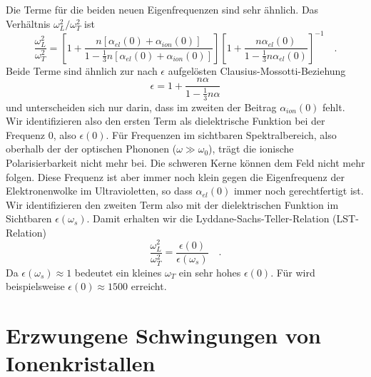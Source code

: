 Die Terme für die beiden neuen Eigenfrequenzen sind sehr ähnlich. Das Verhältnis  $\omega_L^2 / \omega_T^2$ ist
\begin{equation}
    \frac{\omega_L^2}{\omega_T^2} = 
    \left[
    1  + \frac{n \left[ \alpha_{el}(0) + \alpha_{ion}(0)   \right] }{1 - \frac{1}{3} n \left[ \alpha_{el}(0) + \alpha_{ion}(0)   \right]}
    \right]
    \left[
        1  + \frac{n   \alpha_{el}(0)  }{1 - \frac{1}{3} n   \alpha_{el}(0) }
    \right]^{-1} \quad .
\end{equation}
Beide Terme sind ähnlich zur nach $\epsilon$ aufgelösten Clausius-Mossotti-Beziehung
\begin{equation}
    \epsilon = 1 + \frac{n \alpha }{ 1- \frac{1}{3} n \alpha}
\end{equation}
und unterscheiden sich nur darin, dass im zweiten der Beitrag $\alpha_{ion}(0)$ fehlt. Wir identifizieren also den ersten Term als dielektrische Funktion bei der Frequenz $0$, also $\epsilon(0)$. Für Frequenzen im sichtbaren Spektralbereich, also oberhalb der der optischen Phononen ($\omega \gg \omega_0$), trägt die ionische Polarisierbarkeit nicht mehr bei. Die schweren Kerne können dem Feld nicht mehr folgen. Diese Frequenz ist aber immer noch klein gegen die Eigenfrequenz der Elektronenwolke im Ultravioletten, so dass $ \alpha_{el}(0)$ immer noch gerechtfertigt ist. Wir identifizieren den zweiten Term also mit der dielektrischen Funktion im Sichtbaren $\epsilon(\omega_{s})$. Damit erhalten wir die Lyddane-Sachs-Teller-Relation (LST-Relation)
\begin{equation}
    \frac{\omega_L^2}{\omega_T^2} =\frac{\epsilon(0)}{\epsilon(\omega_s)} \quad .
\end{equation}
Da  $\epsilon(\omega_{s}) \approx 1$ bedeutet ein kleines $\omega_T$ ein sehr hohes $\epsilon(0)$. Für  wird beispielsweise $\epsilon(0) \approx 1500$ erreicht.


\section*{Erzwungene Schwingungen von Ionenkristallen}

